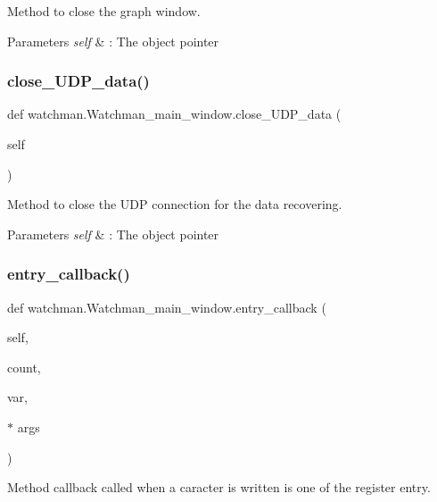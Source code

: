Method to close the graph window. 


\begin{DoxyParams}{Parameters}
{\em self} & \+: The object pointer \\
\hline
\end{DoxyParams}
\mbox{\label{classwatchman_1_1_watchman__main__window_a82bd875a2c1e218633bb245011730233}} 
\subsubsection{close\_UDP\_data()}
{\footnotesize\ttfamily def watchman.\+Watchman\+\_\+main\+\_\+window.\+close\+\_\+\+U\+D\+P\+\_\+data (\begin{DoxyParamCaption}\item[{}]{self }\end{DoxyParamCaption})}



Method to close the U\+DP connection for the data recovering. 


\begin{DoxyParams}{Parameters}
{\em self} & \+: The object pointer \\
\hline
\end{DoxyParams}
\mbox{\label{classwatchman_1_1_watchman__main__window_ad063c9cf9786f9b04da469c373ab9e73}} 
\subsubsection{entry\_callback()}
{\footnotesize\ttfamily def watchman.\+Watchman\+\_\+main\+\_\+window.\+entry\+\_\+callback (\begin{DoxyParamCaption}\item[{}]{self,  }\item[{}]{count,  }\item[{}]{var,  }\item[{$\ast$}]{args }\end{DoxyParamCaption})}



Method callback called when a caracter is written is one of the register entry. 


